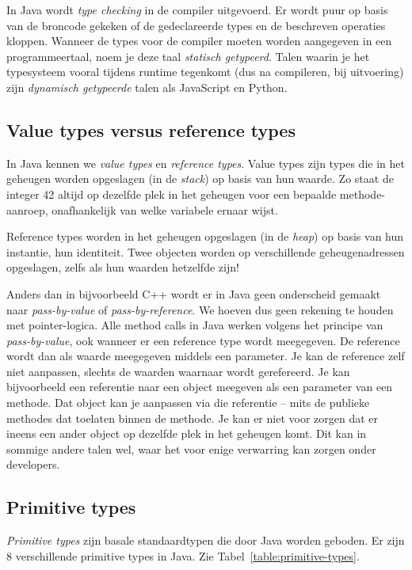 In Java wordt \textit{type checking} in de compiler uitgevoerd. Er wordt 
puur op basis van de broncode gekeken of de gedeclareerde types en de beschreven 
operaties kloppen. Wanneer de types voor de compiler moeten worden aangegeven in 
een programmeertaal, noem je deze taal \textit{statisch getypeerd}. Talen waarin 
je het typesysteem vooral tijdens runtime tegenkomt (dus na compileren, bij uitvoering) 
zijn \textit{dynamisch getypeerde} talen als JavaScript en Python.

\subsection{Value types versus reference types}
In Java kennen we \textit{value types} en \textit{reference types}.
Value types zijn types die in het geheugen worden opgeslagen (in de \textit{stack}) 
op basis van hun waarde. 
Zo staat de integer 42 altijd op dezelfde plek in het geheugen voor een bepaalde 
methode-aanroep, onafhankelijk van welke variabele ernaar wijst. 

Reference types worden in het geheugen opgeslagen (in de \textit{heap}) 
op basis van hun instantie, hun identiteit.
Twee objecten worden op verschillende geheugenadressen opgeslagen, zelfs als hun 
waarden hetzelfde zijn!

Anders dan in bijvoorbeeld C++ wordt er in Java geen onderscheid gemaakt naar 
\textit{pass-by-value} of \textit{pass-by-reference}. We hoeven dus geen rekening 
te houden met pointer-logica. Alle method calls in Java werken 
volgens het principe van \textit{pass-by-value}, ook wanneer er een reference
type wordt meegegeven. De reference wordt dan als waarde meegegeven middels een
parameter. Je kan de reference zelf niet aanpassen, slechts de waarden waarnaar 
wordt gerefereerd. Je kan bijvoorbeeld een referentie naar een object meegeven 
als een parameter van een methode. 
Dat object kan je aanpassen via die referentie -- mits de publieke methodes dat toelaten binnen 
de methode. Je kan er niet voor zorgen dat er ineens een ander object op dezelfde plek in 
het geheugen komt. Dit kan in sommige andere talen wel, 
waar het voor enige verwarring kan zorgen onder developers.

\subsection{Primitive types}
\textit{Primitive types} zijn basale standaardtypen die door Java worden geboden.
Er zijn 8 verschillende primitive types in Java.
Zie Tabel~\ref{table:primitive-types}. 

